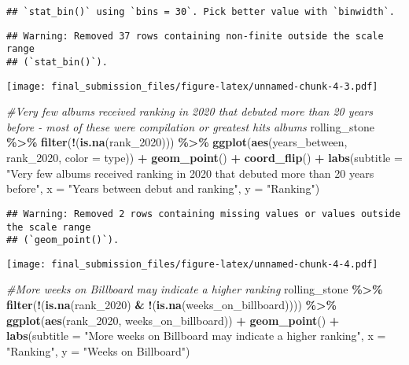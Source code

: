\documentclass[
]{article}
\newenvironment{Shaded}{\begin{snugshade}}{\end{snugshade}}
\newcommand{\AttributeTok}[1]{\textcolor[rgb]{0.13,0.29,0.53}{#1}}
\newcommand{\CommentTok}[1]{\textcolor[rgb]{0.56,0.35,0.01}{\textit{#1}}}
\newcommand{\FunctionTok}[1]{\textcolor[rgb]{0.13,0.29,0.53}{\textbf{#1}}}
\newcommand{\NormalTok}[1]{#1}
\newcommand{\SpecialCharTok}[1]{\textcolor[rgb]{0.81,0.36,0.00}{\textbf{#1}}}
\newcommand{\StringTok}[1]{\textcolor[rgb]{0.31,0.60,0.02}{#1}}
\begin{document}
\begin{verbatim}
## `stat_bin()` using `bins = 30`. Pick better value with `binwidth`.
\end{verbatim}

\begin{verbatim}
## Warning: Removed 37 rows containing non-finite outside the scale range
## (`stat_bin()`).
\end{verbatim}

\texttt{[image: final\_submission\_files/figure-latex/unnamed-chunk-4-3.pdf]}

\begin{Shaded}
\begin{Highlighting}[]
\CommentTok{\#Very few albums received ranking in 2020 that debuted more than 20 years before {-} most of these were compilation or greatest hits albums}
\NormalTok{rolling\_stone }\SpecialCharTok{\%\textgreater{}\%}
  \FunctionTok{filter}\NormalTok{(}\SpecialCharTok{!}\NormalTok{(}\FunctionTok{is.na}\NormalTok{(rank\_2020))) }\SpecialCharTok{\%\textgreater{}\%}
  \FunctionTok{ggplot}\NormalTok{(}\FunctionTok{aes}\NormalTok{(years\_between, rank\_2020, }\AttributeTok{color =}\NormalTok{ type)) }\SpecialCharTok{+}
  \FunctionTok{geom\_point}\NormalTok{() }\SpecialCharTok{+}
  \FunctionTok{coord\_flip}\NormalTok{() }\SpecialCharTok{+}
  \FunctionTok{labs}\NormalTok{(}\AttributeTok{subtitle =} \StringTok{"Very few albums received ranking in 2020 that debuted more than 20 years before"}\NormalTok{, }\AttributeTok{x =} \StringTok{"Years between debut and ranking"}\NormalTok{, }\AttributeTok{y =} \StringTok{"Ranking"}\NormalTok{)}
\end{Highlighting}
\end{Shaded}

\begin{verbatim}
## Warning: Removed 2 rows containing missing values or values outside the scale range
## (`geom_point()`).
\end{verbatim}

\texttt{[image: final\_submission\_files/figure-latex/unnamed-chunk-4-4.pdf]}

\begin{Shaded}
\begin{Highlighting}[]
\CommentTok{\#More weeks on Billboard may indicate a higher ranking}
\NormalTok{rolling\_stone }\SpecialCharTok{\%\textgreater{}\%}
  \FunctionTok{filter}\NormalTok{(}\SpecialCharTok{!}\NormalTok{(}\FunctionTok{is.na}\NormalTok{(rank\_2020) }\SpecialCharTok{\&} \SpecialCharTok{!}\NormalTok{(}\FunctionTok{is.na}\NormalTok{(weeks\_on\_billboard)))) }\SpecialCharTok{\%\textgreater{}\%}
  \FunctionTok{ggplot}\NormalTok{(}\FunctionTok{aes}\NormalTok{(rank\_2020, weeks\_on\_billboard)) }\SpecialCharTok{+}
  \FunctionTok{geom\_point}\NormalTok{() }\SpecialCharTok{+}
  \FunctionTok{labs}\NormalTok{(}\AttributeTok{subtitle =} \StringTok{"More weeks on Billboard may indicate a higher ranking"}\NormalTok{, }\AttributeTok{x =} \StringTok{"Ranking"}\NormalTok{, }\AttributeTok{y =} \StringTok{"Weeks on Billboard"}\NormalTok{)}
\end{Highlighting}
\end{Shaded}
\end{document}
